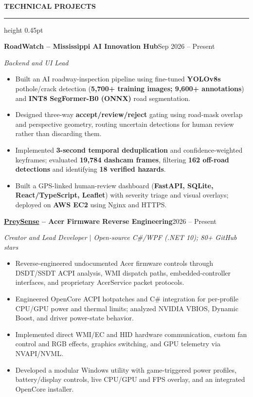 \documentclass[11pt]{article}
\newcommand{\cvsection}[1]{%
  \Needspace{4\baselineskip}%
  \par\addvspace{8.5pt}%
  \noindent\textbf{\MakeUppercase{#1}}\par\nobreak
  \vspace{2pt}\hrule height 0.45pt\relax\nobreak\vspace{4pt}%
}
\newcommand{\subentry}[2]{\par\noindent\textbf{#1}\hfill #2\par}
\begin{document}
\cvsection{Technical Projects}
\subentry{RoadWatch -- Mississippi AI Innovation Hub}{Sep 2026 -- Present}
\textit{Backend and UI Lead}
\begin{itemize}
    \item Built an AI roadway-inspection pipeline using fine-tuned \textbf{YOLOv8s} pothole/crack detection (\textbf{5,700+ training images; 9,600+ annotations}) and \textbf{INT8 SegFormer-B0 (ONNX)} road segmentation.
    \item Designed three-way \textbf{accept/review/reject} gating using road-mask overlap and perspective geometry, routing uncertain detections for human review rather than discarding them.
    \item Implemented \textbf{3-second temporal deduplication} and confidence-weighted keyframes; evaluated \textbf{19,784 dashcam frames}, filtering \textbf{162 off-road detections} and identifying \textbf{18 verified hazards}.
    \item Built a GPS-linked human-review dashboard (\textbf{FastAPI, SQLite, React/TypeScript, Leaflet}) with severity triage and visual overlays; deployed on \textbf{AWS EC2} using Nginx and HTTPS.
\end{itemize}
\vspace{2pt}
\subentry{\href{https://github.com/hammadzaigham/PreySense}{PreySense} -- Acer Firmware Reverse Engineering}{2026 -- Present}
\textit{Creator and Lead Developer $\vert$ Open-source C\#/WPF (.NET 10); 80+ GitHub stars}
\begin{itemize}
  \item Reverse-engineered undocumented Acer firmware controls through DSDT/SSDT
  ACPI analysis, WMI dispatch paths, embedded-controller interfaces, and proprietary
  AcerService packet protocols.
  \item Engineered OpenCore ACPI hotpatches and C\# integration for per-profile CPU/GPU
  power and thermal limits; analyzed NVIDIA VBIOS, Dynamic Boost, and driver
  power-state behavior.
  \item Implemented direct WMI/EC and HID hardware communication, custom fan
  control and RGB effects, graphics switching, and GPU telemetry via NVAPI/NVML.
  \item Developed a modular Windows utility with game-triggered power profiles,
  battery/display controls, live CPU/GPU and FPS overlay, and an integrated
  OpenCore installer.
\end{itemize}
\end{document}
